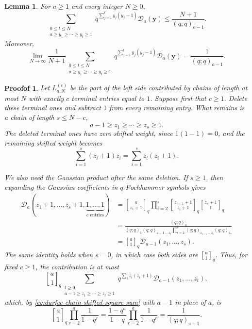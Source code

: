 \documentclass[10pt,a4paper]{amsart}
\newtheorem{proofof}{Proofof}
\newtheorem{lemma}{Lemma}
\renewcommand{\geq}{\geqslant}
\renewcommand{\leq}{\leqslant}
\newcommand{\qgauss}[2]{\genfrac{[}{]}{0pt}{}{#1}{#2}_q}
\begin{document}
\begin{lemma}\label{lem:shifted-chain}
For $a\geq 1$ and every integer $N\geq 0$,
\[
\sum_{\substack{0\leq t\leq N\\ a\geq y_1\geq\cdots\geq y_t\geq 1}}
        q^{\sum_{j=1}^t y_j(y_j-1)}
        \mathcal D_a(\mathbf y)
        \leq
        \frac{N+1}{(q;q)_{a-1}}.
\]
Moreover,
\[
\lim_{N\to\infty}\frac{1}{N+1}
\sum_{\substack{0\leq t\leq N\\ a\geq y_1\geq\cdots\geq y_t\geq 1}}
        q^{\sum_{j=1}^t y_j(y_j-1)}
        \mathcal D_a(\mathbf y)
        =
        \frac{1}{(q;q)_{a-1}}.
\]
\end{lemma}

\begin{proofof}
Let $L_{a,N}^{(c)}$ be the part of the left side contributed by chains of
length at most $N$ with exactly $c$ terminal entries equal to $1$. Suppose
first that $c\geq 1$. Delete these terminal ones and subtract $1$ from every
remaining entry. What remains is a chain of length $s\leq N-c$,
\[
        a-1\geq z_1\geq\cdots\geq z_s\geq 1.
\]
The deleted terminal ones have zero shifted weight, since $1(1-1)=0$, and the
remaining shifted weight becomes
\[
        \sum_{i=1}^s (z_i+1)z_i=
        \sum_{i=1}^s z_i(z_i+1).
\]

We also need the Gaussian product after the same deletion. If $s\geq 1$, then
expanding the Gaussian coefficients in $q$-Pochhammer symbols gives
\[
\begin{aligned}
        \mathcal D_a(z_1+1,\ldots,z_s+1,\underbrace{1,\ldots,1}_{\text{$c$ entries}})
        &=
        \qgauss{a}{z_1+1}
        \prod_{i=2}^{s}\qgauss{z_{i-1}+1}{z_i+1}
        \qgauss{z_s+1}{1}                                      \\
        &=
        \frac{(q;q)_a}
        {(q;q)_1(q;q)_{a-1-z_1}
        \prod_{i=2}^{s}(q;q)_{z_{i-1}-z_i}(q;q)_{z_s}}           \\
        &=
        \qgauss{a}{1}\mathcal D_{a-1}(z_1,\ldots,z_s).
\end{aligned}
\]
The same identity holds when $s=0$, in which case both sides are
$\qgauss{a}{1}$. Thus, for fixed $c\geq 1$, the contribution is at most
\[
        \qgauss{a}{1}
        \sum_{\substack{t\geq 0\\ a-1\geq z_1\geq\cdots\geq z_t\geq 1}}
        q^{\sum_i z_i(z_i+1)}\mathcal D_{a-1}(z_1,\ldots,z_t),
\]
which, by \eqref{eq:durfee-chain-shifted-square-sum} with $a-1$ in place of $a$, is
\[
        \qgauss{a}{1}
        \prod_{r=2}^{a}\frac{1}{1-q^r}
        =
        \frac{1-q^a}{1-q}
        \prod_{r=2}^{a}\frac{1}{1-q^r}
        =
        \frac{1}{(q;q)_{a-1}}.
\]


\end{proofof}
\end{document}

